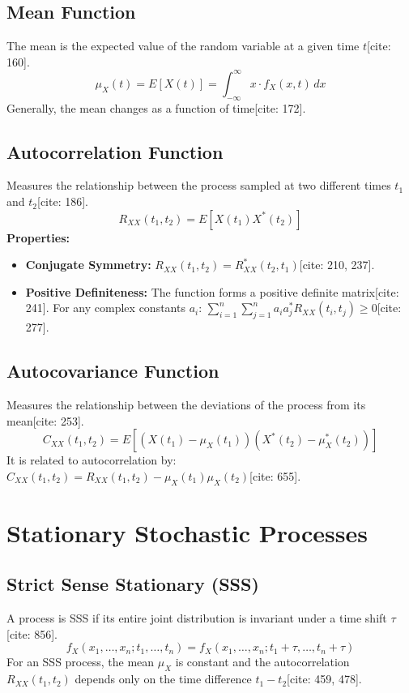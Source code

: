 \documentclass[11pt]{article}
\begin{document}
\subsection{Mean Function}
The mean is the expected value of the random variable at a given time $t$[cite: 160].
\begin{equation}
    \mu_X(t) = E[X(t)] = \int_{-\infty}^{\infty} x \cdot f_X(x, t) \, dx
\end{equation}
Generally, the mean changes as a function of time[cite: 172].

\subsection{Autocorrelation Function}
Measures the relationship between the process sampled at two different times $t_1$ and $t_2$[cite: 186].
\begin{equation}
    R_{XX}(t_1, t_2) = E[X(t_1)X^*(t_2)]
\end{equation}
\textbf{Properties:}
\begin{itemize}
    \item \textbf{Conjugate Symmetry:} $R_{XX}(t_1, t_2) = R_{XX}^*(t_2, t_1)$[cite: 210, 237].
    \item \textbf{Positive Definiteness:} The function forms a positive definite matrix[cite: 241]. For any complex constants $a_i$:
    $\sum_{i=1}^{n}\sum_{j=1}^{n} a_i a_j^* R_{XX}(t_i, t_j) \ge 0$[cite: 277].
\end{itemize}

\subsection{Autocovariance Function}
Measures the relationship between the deviations of the process from its mean[cite: 253].
\begin{equation}
    C_{XX}(t_1, t_2) = E[(X(t_1) - \mu_X(t_1))(X^*(t_2) - \mu_X^*(t_2))]
\end{equation}
It is related to autocorrelation by: $C_{XX}(t_1, t_2) = R_{XX}(t_1, t_2) - \mu_X(t_1)\mu_X(t_2)$[cite: 655].

\section{Stationary Stochastic Processes}

\subsection{Strict Sense Stationary (SSS)}
A process is SSS if its entire joint distribution is invariant under a time shift $\tau$[cite: 856].
\begin{equation}
    f_X(x_1, \dots, x_n; t_1, \dots, t_n) = f_X(x_1, \dots, x_n; t_1 + \tau, \dots, t_n + \tau)
\end{equation}
For an SSS process, the mean $\mu_X$ is constant and the autocorrelation $R_{XX}(t_1, t_2)$ depends only on the time difference $t_1 - t_2$[cite: 459, 478].
\end{document}

